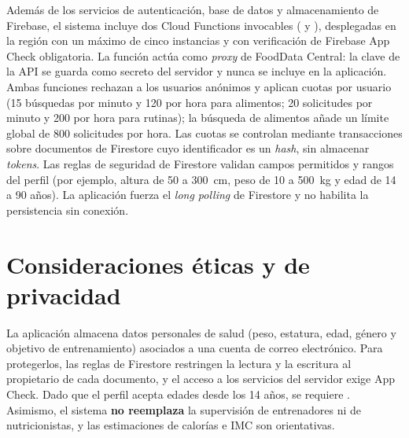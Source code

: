 Además de los servicios de autenticación, base de datos y almacenamiento de
Firebase, el sistema incluye dos Cloud Functions invocables
( y ), desplegadas en la región
 con un máximo de cinco instancias y con verificación de
Firebase App Check obligatoria. La función  actúa como
\emph{proxy} de FoodData Central: la clave de la API se guarda como secreto del
servidor y nunca se incluye en la aplicación. Ambas funciones rechazan a los
usuarios anónimos y aplican cuotas por usuario (15 búsquedas por minuto y 120
por hora para alimentos; 20 solicitudes por minuto y 200 por hora para
rutinas); la búsqueda de alimentos añade un límite global de 800 solicitudes por
hora. Las cuotas se controlan mediante transacciones sobre documentos de
Firestore cuyo identificador es un \emph{hash}, sin almacenar \emph{tokens}.
Las reglas de seguridad de Firestore validan campos permitidos y rangos del perfil
(por ejemplo, altura de 50 a 300~cm, peso de 10 a 500~kg y edad de 14 a 90
años). La aplicación fuerza el \emph{long polling} de Firestore y no habilita
la persistencia sin conexión.

\section{Consideraciones éticas y de privacidad}
\label{sec:etica}

La aplicación almacena datos personales de salud (peso, estatura, edad, género
y objetivo de entrenamiento) asociados a una cuenta de correo electrónico. Para
protegerlos, las reglas de Firestore restringen la lectura y la escritura al
propietario de cada documento, y el acceso a los servicios del servidor exige
App Check. Dado que el perfil acepta edades desde los 14 años, se requiere
. Asimismo, el sistema \textbf{no reemplaza} la supervisión
de entrenadores ni de nutricionistas, y las estimaciones de calorías e IMC son
orientativas.

